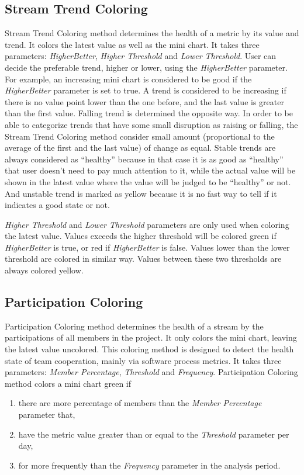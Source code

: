 \subsection{Stream Trend Coloring} 
Stream Trend Coloring method determines the health of a metric by its value and trend. It colors the latest value as well as the mini chart. It takes three parameters: {\it HigherBetter}, {\it Higher Threshold} and {\it Lower Threshold}. User can decide the preferable trend, higher or lower, using the {\it HigherBetter} parameter. For example, an increasing mini chart is considered to be good if the {\it HigherBetter} parameter is set to true. A trend is considered to be increasing if there is no value point lower than the one before, and the last value is greater than the first value. Falling trend is determined the opposite way. In order to be able to categorize trends that have some small disruption as raising or falling, the Stream Trend Coloring method consider small amount (proportional to the average of the first and the last value) of change as equal. Stable trends are always considered as ``healthy'' because in that case it is as good as ``healthy'' that user doesn't need to pay much attention to it, while the actual value will be shown in the latest value where the value will be judged to be ``healthy'' or not. And unstable trend is marked as yellow because it is no fast way to tell if it indicates a good state or not. 

{\it Higher Threshold} and {\it Lower Threshold} parameters are only used when coloring the latest value. Values exceeds the higher threshold will be colored green if {\it HigherBetter} is true, or red if {\it HigherBetter} is false. Values lower than the lower threshold are colored in similar way. Values between these two thresholds are always colored yellow.

\subsection{Participation Coloring}
Participation Coloring method determines the health of a stream by the participations of all members in the project. It only colors the mini chart, leaving the latest value uncolored. This coloring method is designed to detect the health state of team cooperation, mainly via software process metrics. It takes three parameters: {\it Member Percentage}, {\it Threshold} and {\it Frequency}. Participation Coloring method colors a mini chart green if 
\begin{enumerate}
\item there are more percentage of members than the {\it Member Percentage} parameter that,
\item have the metric value greater than or equal to the {\it Threshold} parameter per day,
\item for more frequently than the {\it Frequency} parameter in the analysis period.
\end{enumerate}

